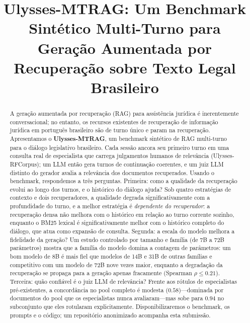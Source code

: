 \documentclass[conference]{IEEEtran}
\begin{document}
\title{Ulysses-MTRAG: Um Benchmark Sintético Multi-Turno para\\
Geração Aumentada por Recuperação sobre Texto Legal Brasileiro}

\author{
}

\maketitle

\begin{abstract}
A geração aumentada por recuperação (RAG) para assistência jurídica é
inerentemente conversacional; no entanto, os recursos existentes de recuperação
de informação jurídica em português brasileiro são de turno único e param na
recuperação. Apresentamos o \textbf{Ulysses-MTRAG}, um benchmark sintético de RAG
multi-turno para o diálogo legislativo brasileiro. Cada sessão ancora seu
primeiro turno em uma consulta real de especialista que carrega julgamentos
humanos de relevância (Ulysses-RFCorpus); um LLM então gera turnos de
continuação coerentes, e um juiz LLM distinto do gerador avalia a relevância dos
documentos recuperados. Usando o benchmark, respondemos a três perguntas.
Primeira: como a qualidade da recuperação evolui ao longo dos turnos, e o
histórico do diálogo ajuda? Sob quatro estratégias de contexto e dois
recuperadores, a qualidade degrada significativamente com a profundidade do
turno, e a melhor estratégia é \emph{dependente do recuperador}: a recuperação
densa não melhora com o histórico em relação ao turno corrente sozinho, enquanto
o BM25 lexical é significativamente melhor com o histórico completo do diálogo,
que atua como expansão de consulta. Segunda: a escala do modelo melhora a
fidelidade da geração? Um estudo controlado por tamanho e família (de 7B a 72B
parâmetros) mostra que a família do modelo domina a contagem de parâmetros: um
bom modelo de 8B é mais fiel que modelos de 14B e 31B de outras famílias e
competitivo com um modelo de 72B nove vezes maior, enquanto a degradação da
recuperação se propaga para a geração apenas fracamente (Spearman
$\rho\!\le\!0.21$). Terceira: quão confiável é o juiz LLM de relevância? Frente
aos rótulos de especialistas pré-existentes, a concordância no pool completo é
modesta ($0.58$)---dominada por documentos do pool que os especialistas nunca
avaliaram---mas sobe para $0.94$ no subconjunto que eles rotularam
explicitamente. Disponibilizaremos o benchmark, os prompts e o código; um
repositório anonimizado acompanha esta submissão.
\end{abstract}
\end{document}
